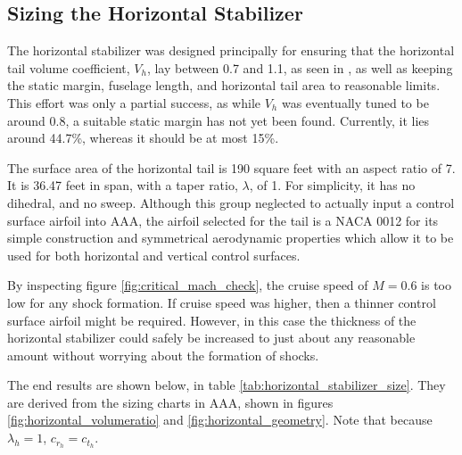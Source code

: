 \documentclass[conf]{new-aiaa}
\begin{document}
\subsection{Sizing the Horizontal Stabilizer} %

The horizontal stabilizer was designed principally for ensuring that the 
horizontal tail volume coefficient, $V_h$, lay between 0.7 and 1.1, as seen 
in \cite{orange_book}, as well as keeping the static margin, fuselage length, 
and horizontal tail area to reasonable limits. This effort was only a 
partial success, as while $V_h$ was eventually tuned to be around 0.8, a 
suitable static margin has not yet been found. Currently, it lies around 44.7\%,
whereas it should be at most 15\%.

The surface area of the horizontal tail is 190 square feet with an aspect 
ratio of 7. It is 36.47 feet in span, with a taper ratio, $\lambda$, of 1. 
For simplicity, it has no dihedral, and no sweep. Although this group 
neglected to actually input a control surface airfoil into AAA, the airfoil 
selected for the tail is a NACA 0012 for its simple construction and 
symmetrical aerodynamic properties which allow it to be used for both 
horizontal and vertical control surfaces.

By inspecting figure \ref{fig:critical_mach_check}, the cruise speed of 
$M=0.6$ is too low for any shock formation. If cruise speed was higher, 
then a thinner control surface airfoil might be required. However, in this 
case the thickness of the horizontal stabilizer could safely be increased to 
just about any reasonable amount without worrying about the formation of shocks.

The end results are shown below, in table 
\ref{tab:horizontal_stabilizer_size}. They are derived from the sizing 
charts in AAA, shown in figures \ref{fig:horizontal_volumeratio} and 
\ref{fig:horizontal_geometry}. Note that because $\lambda_h = 1$,
$c_{r_h} = c_{t_h}$.
\end{document}
